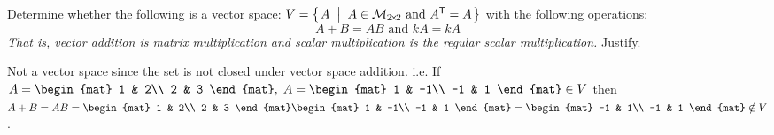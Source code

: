 
\begin{Exercise}[
name={},
title={}, 
difficulty=0,
origin={\cite{YL}}]
Determine whether the following is a vector space: $V=\mbox{$\left\{\hspace{0.1em}A \;\;\middle|\;\; A \in\mathcal{M}_{2 \! \times \! 2} \text{ and } {{A}^{\mathsf{T}}}=A \hspace{0.1em}\right\}$}$
with the following operations:
\[
A+B=AB \text{ and } kA=kA
\]
\textit{That is, vector addition is matrix multiplication and scalar multiplication is the regular scalar multiplication.} Justify.
\end{Exercise}

\begin{Answer}
Not a vector space since the set is not closed under vector space addition.  
i.e. If 
$A=\begin{mat}
1 & 2\\
2 & 3
\end{mat},\; A=\begin{mat}
1 & -1\\
-1 & 1
\end{mat}\in V$
then
$A+B=AB=\begin{mat}
1 & 2\\
2 & 3
\end{mat}\begin{mat}
1 & -1\\
-1 & 1
\end{mat}=
\begin{mat}
-1 & 1\\
-1 & 1
\end{mat}\notin V$.
\end{Answer}

